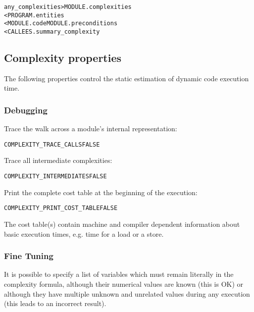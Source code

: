 \documentclass[a4paper]{report}
\newenvironment{PipsProp}{\begin{alltt}}{\end{alltt}}
\newenvironment{PipsMake}{\begin{alltt}}{\end{alltt}}
\begin{document}
\begin{PipsMake}
any_complexities                    > MODULE.complexities
        < PROGRAM.entities
        < MODULE.code MODULE.preconditions
        < CALLEES.summary_complexity
\end{PipsMake}

\subsection{Complexity properties}


The following properties control the static estimation of dynamic code
execution time.

\subsubsection{Debugging}

Trace the walk across a module's internal representation:

\begin{PipsProp}
COMPLEXITY_TRACE_CALLS FALSE
\end{PipsProp}

Trace all intermediate complexities:

\begin{PipsProp}
COMPLEXITY_INTERMEDIATES FALSE
\end{PipsProp}

Print the complete cost table at the beginning of the execution:

\begin{PipsProp}
COMPLEXITY_PRINT_COST_TABLE FALSE
\end{PipsProp}

The cost table(s) contain machine and compiler dependent information
about basic execution times, e.g. time for a load or a store.

\subsubsection{Fine Tuning}

It is possible to specify a list of variables which must remain
literally in the complexity formula, although their numerical values
are known (this is OK) or although they have multiple unknown and
unrelated values during any execution (this leads to an incorrect
result).
\end{document}

